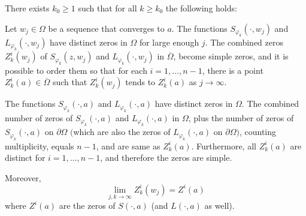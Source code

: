 \documentclass[10pt,a4paper]{amsart}
\newcommand{\Om}{\Omega}
\newcommand{\ov}{\overline}
\begin{document}
	\begin{thm}	
		There exists $k_0 \ge 1$ such that for all $k\geq k_0$ the following holds: 
		
		\medskip
		
		Let $w_j\in\Om$ be a sequence that converges to $a$. The functions $S_{\varphi_k}(\cdot,w_j)$ and $L_{\varphi_k}(\cdot,w_j)$ have distinct zeros in $\Omega$ for large enough $j$. The combined zeros $Z^i_k(w_j)$ of $S_{\varphi_k}(z,w_j)$ and $L_{\varphi_k}(\cdot, w_j)$ in $\overline{\Omega}$, become simple zeros, and it is possible to order them so that for each $i=1,\ldots, n-1$, there is a point $Z_k^i(a)\in\ov{\Om}$ such that $Z^i_k(w_j)$ tends to $Z^i_k(a)$ as $j\rightarrow\infty$. 
		
		\medskip
		
		The functions $S_{\varphi_k}(\cdot,a)$ and $L_{\varphi_k}(\cdot,a)$ have distinct zeros in $\Omega$. The combined number of zeros of $S_{\varphi_k}(\cdot, a)$ and $L_{\varphi_k}(\cdot,a)$ in $\Om$, plus the number of zeros of  $S_{\varphi_k}(\cdot,a)$ on $\partial\Om$ $($which are also the zeros of $L_{\varphi_k}(\cdot,a)$ on $\partial\Om)$, counting multiplicity, equals $n-1$, and are same as $Z_{k}^i(a)$. Furthermore, all $Z_{k}^i(a)$ are distinct for $i=1,\ldots, n-1$, and therefore the zeros are simple.
		
		\medskip
		
		Moreover, 
		\[
		\lim_{j,k\rightarrow\infty} Z^i_{k}(w_j) = Z^i(a)
		\]
		where $Z^i(a)$ are the zeros of $S(\cdot,a)$ (and $L(\cdot,a)$ as well).
	\end{thm}
\end{document}
